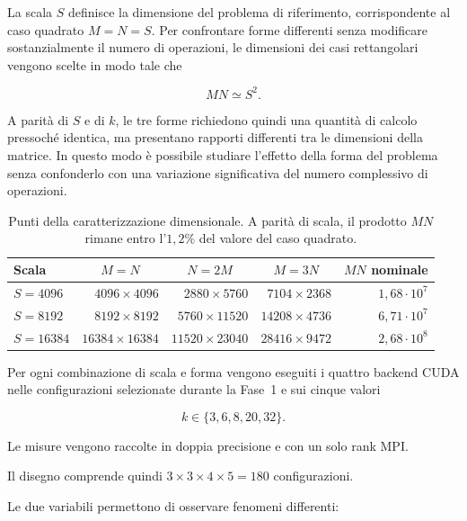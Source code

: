 La scala $S$ definisce la dimensione del problema di riferimento,
corrispondente al caso quadrato $M=N=S$. Per confrontare forme differenti senza modificare
sostanzialmente il numero di operazioni, le dimensioni dei casi
rettangolari vengono scelte in modo tale che

\[
MN \simeq S^2.
\]

A parità di $S$ e di $k$, le tre forme richiedono quindi una quantità di
calcolo pressoché identica, ma presentano rapporti differenti tra le
dimensioni della matrice. In questo modo è possibile studiare l'effetto
della forma del problema senza confonderlo con una variazione significativa
del numero complessivo di operazioni.

\begin{table}[H]
\centering
\footnotesize
\caption{Punti della caratterizzazione dimensionale. A parità di scala,
il prodotto $MN$ rimane entro l'$1{,}2\%$ del valore del caso quadrato.}
\label{tab:fase2-punti}
\begin{tabular}{@{}lrrrr@{}}
\toprule
\textbf{Scala}
& \multicolumn{1}{c}{$M=N$}
& \multicolumn{1}{c}{$N=2M$}
& \multicolumn{1}{c}{$M=3N$}
& \textbf{$MN$ nominale} \\
\midrule
$S=4096$
& $4096\times4096$
& $2880\times5760$
& $7104\times2368$
& $1{,}68\cdot10^{7}$ \\

$S=8192$
& $8192\times8192$
& $5760\times11520$
& $14208\times4736$
& $6{,}71\cdot10^{7}$ \\

$S=16384$
& $16384\times16384$
& $11520\times23040$
& $28416\times9472$
& $2{,}68\cdot10^{8}$ \\
\bottomrule
\end{tabular}
\end{table}

Per ogni combinazione di scala e forma vengono eseguiti i quattro backend
CUDA nelle configurazioni selezionate durante la Fase~1 e sui cinque valori

\[
k\in\{3,6,8,20,32\}.
\]

Le misure vengono raccolte in doppia precisione e con un solo rank MPI.

Il disegno comprende quindi
$3 \times 3 \times 4 \times 5 = 180$
configurazioni.

Le due variabili permettono di osservare fenomeni differenti:

